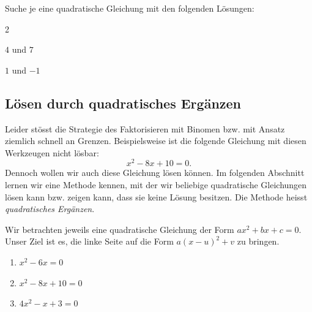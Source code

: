 \documentclass[11pt,oneside]{article}
\begin{document}
	\begin{aufgabe}[Konstruieren]
		Suche je eine quadratische Gleichung mit den folgenden Lösungen:
		\begin{enumerate}[label=\alph*)]\end{enumerate}
	\end{aufgabe}

\subsection{Lösen durch quadratisches Ergänzen}
	Leider stösst die Strategie des Faktorisieren mit Binomen bzw. mit Ansatz ziemlich schnell an Grenzen. Beispielsweise ist die folgende Gleichung mit diesen Werkzeugen nicht lösbar: \[x^2-8x+10=0.\]
	Dennoch wollen wir auch diese Gleichung lösen können. Im folgenden Abschnitt lernen wir eine Methode kennen, mit der wir beliebige quadratische Gleichungen lösen kann bzw. zeigen kann, dass sie keine Lösung besitzen. Die Methode heisst \textit{quadratisches Ergänzen}.
	\begin{beispiel}
		Wir betrachten jeweils eine quadratische Gleichung der Form $ax^2+bx+c=0$. Unser Ziel ist es, die linke Seite auf die Form $a(x-u)^2+v$ zu bringen.
		\begin{enumerate}[label=\alph*)]
			\item $x^2-6x=0$
		\end{enumerate}
		\begin{enumerate}[label=\alph*)]
			\setcounter{enumi}{1}
			\item $x^2-8x+10=0$
		\end{enumerate}
		\begin{enumerate}[label=\alph*)]
			\setcounter{enumi}{2}
			\item $4x^2-x+3=0$
		\end{enumerate}
	\end{beispiel}
\end{document}
